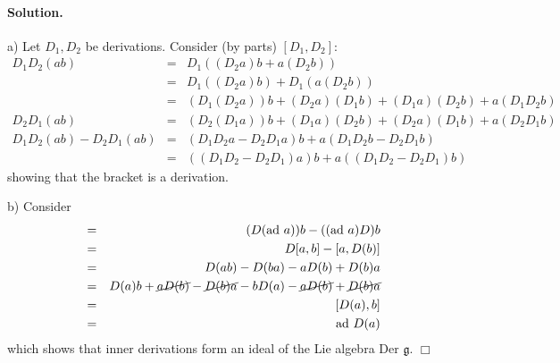 \documentclass[11pt]{article}
\newcommand{\Der}{\mbox{Der\ }}
\newcommand{\ad}{\mbox{ad\ }}
\newcommand{\g}{\mathfrak{g}}
\newcommand{\sk}{\vspace*{1em}}
\begin{document}
\paragraph{Solution.} 
a) Let $D_1, D_2$ be derivations.  Consider (by parts) $[D_1, D_2]$:
\begin{eqnarray*}
D_1D_2(ab) &=& D_1((D_2a)b + a(D_2b)) \\
       &=& D_1((D_2a)b) + D_1(a(D_2b)) \\
       &=& (D_1(D_2a))b+(D_2a)(D_1b)+(D_1a)(D_2b) + a(D_1D_2b) \\
D_2D_1(ab) &=& (D_2(D_1a))b+(D_1a)(D_2b)+(D_2a)(D_1b) + a(D_2D_1b) \\
D_1D_2(ab) - D_2D_1(ab) &=& (D_1D_2a-D_2D_1a)b + a(D_1D_2b-D_2D_1b) \\
        &=& ((D_1D_2-D_2D_1)a)b + a((D_1D_2-D_2D_1)b) 
\end{eqnarray*}
showing that the bracket is a derivation.

\sk\noindent
b) Consider 
\begin{eqnarray*}
[D, \ad a] &=& (D(\ad a))b - ((\ad a)D)b \\
 &=& D[a,b] - [a, D(b)]\\
 &=& D(ab) - D(ba) - aD(b) + D(b)a\\
 &=& D(a)b + \cancel{aD(b)} - \cancel{D(b)a} - bD(a) - \cancel{aD(b)} + \cancel{D(b)a} \\
 &=& [D(a), b]\\
 &=& \ad D(a)
\end{eqnarray*}
which shows that inner derivations form an ideal of the Lie algebra
$\Der \g$. $\Box$
\end{document}
